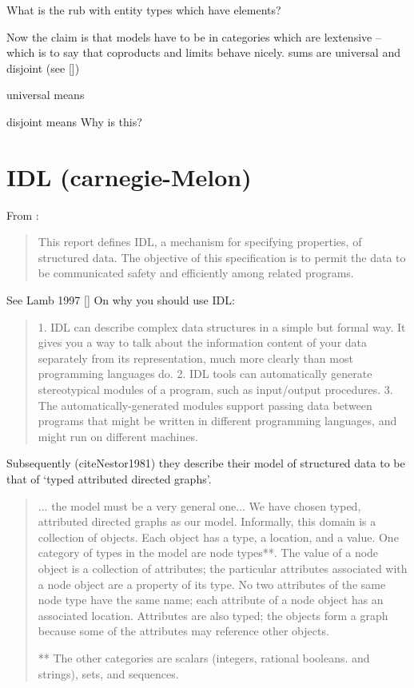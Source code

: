 \documentclass[10pt,a4paper]{scrartcl}
\begin{document}
What is the rub with entity types which have elements?

Now the claim is that models have to be in categories which are lextensive -- which is to say
that coproducts and limits behave nicely. sums are universal and disjoint (see [\cite {Carboni1993}])

universal means

disjoint means 
Why is this?

\section{IDL (carnegie-Melon)}

From \cite{Nestor1981}:

\begin{quote}
This report defines IDL, a mechanism for specifying properties, of structured data. The objective of this
specification is to permit the data to be communicated safety and efficiently among related programs.
\end{quote}

See Lamb 1997 [\cite{Lamb1997}]
On why you should use IDL:
\begin{quote}
1. IDL can describe complex data structures in a simple but formal way.
It gives you a way to talk about the information content of your data
separately from its representation, much more clearly than most programming 
languages do.
2. IDL tools can automatically generate stereotypical modules of a program,
such as input/output procedures.
3. The automatically-generated modules support passing data between programs 
that might be written in different programming languages, and
might run on different machines.
\end{quote}

Subsequently (cite{Nestor1981}) they describe their model of structured data to be that of `typed attributed directed graphs'. 

\begin{quote}
... the
model must be a very general one... We have
chosen typed, attributed directed graphs as our model. Informally, this domain is a collection of objects.
Each object has a type, a location, and a value. One category of types in the model are node types**. The value
of a node object is a collection of attributes; the particular attributes associated with a node object are a
property of its type. No two attributes of the same node type have the same name; each attribute of a node
object has an associated location. Attributes are also typed; the objects form a graph because some of the
attributes may reference other objects.

** The other categories are scalars (integers, rational booleans. and strings), sets, and sequences.
\end{quote}
\end{document}
